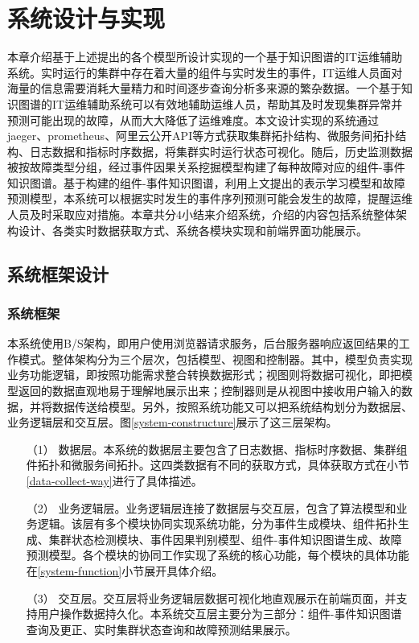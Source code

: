 \chapter{系统设计与实现}
本章介绍基于上述提出的各个模型所设计实现的一个基于知识图谱的IT运维辅助系统。实时运行的集群中存在着大量的组件与实时发生的事件，IT运维人员面对海量的信息需要消耗大量精力和时间逐步查询分析多来源的繁杂数据。一个基于知识图谱的IT运维辅助系统可以有效地辅助运维人员，帮助其及时发现集群异常并预测可能出现的故障，从而大大降低了运维难度。本文设计实现的系统通过jaeger\cite{mengistu2020distributed}、prometheus\cite{padgham2002prometheus}、阿里云公开API等方式获取集群拓扑结构、微服务间拓扑结构、日志数据和指标时序数据，将集群实时运行状态可视化。随后，历史监测数据被按故障类型分组，经过事件因果关系挖掘模型构建了每种故障对应的组件-事件知识图谱。基于构建的组件-事件知识图谱，利用上文提出的表示学习模型和故障预测模型，本系统可以根据实时发生的事件序列预测可能会发生的故障，提醒运维人员及时采取应对措施。本章共分4小结来介绍系统，介绍的内容包括系统整体架构设计、各类实时数据获取方式、系统各模块实现和前端界面功能展示。
\section{系统框架设计}
\subsection{系统框架}
本系统使用B/S架构，即用户使用浏览器请求服务，后台服务器响应返回结果的工作模式。整体架构分为三个层次，包括模型、视图和控制器。其中，模型负责实现业务功能逻辑，即按照功能需求整合转换数据形式；视图则将数据可视化，即把模型返回的数据直观地易于理解地展示出来；控制器则是从视图中接收用户输入的数据，并将数据传送给模型。另外，按照系统功能又可以把系统结构划分为数据层、业务逻辑层和交互层。图\ref{system-constructure}展示了这三层架构。
\begin{itemize}
    \item [（1）]数据层。本系统的数据层主要包含了日志数据、指标时序数据、集群组件拓扑和微服务间拓扑。这四类数据有不同的获取方式，具体获取方式在小节\ref{data-collect-way}进行了具体描述。
    \item [（2）]业务逻辑层。业务逻辑层连接了数据层与交互层，包含了算法模型和业务逻辑。该层有多个模块协同实现系统功能，分为事件生成模块、组件拓扑生成、集群状态检测模块、事件因果判别模型、组件-事件知识图谱生成、故障预测模型。各个模块的协同工作实现了系统的核心功能，每个模块的具体功能在\ref{system-function}小节展开具体介绍。
    \item [（3）]交互层。交互层将业务逻辑层数据可视化地直观展示在前端页面，并支持用户操作数据持久化。本系统交互层主要分为三部分：组件-事件知识图谱查询及更正、实时集群状态查询和故障预测结果展示。
\end{itemize}

